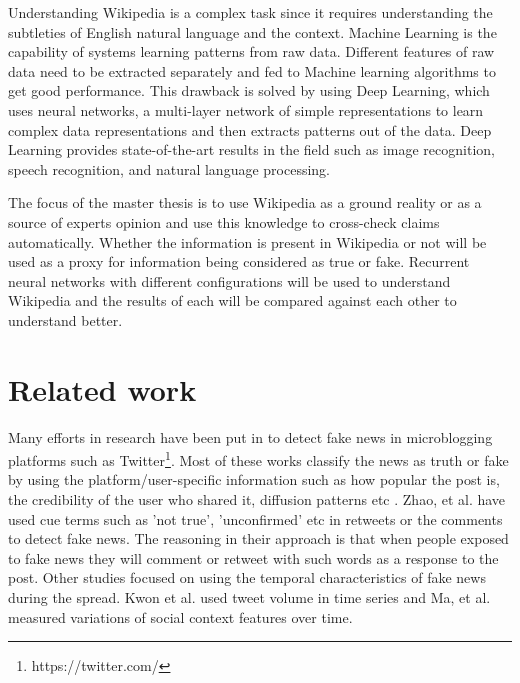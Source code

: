 \documentclass[a4paper, 11pt]{article}
\begin{document}
Understanding Wikipedia is a complex task since it requires understanding the subtleties of English natural language and the context. Machine Learning is the capability of systems learning patterns from raw data. Different features of raw data need to be extracted separately and fed to Machine learning algorithms to get good performance. This drawback is solved by using Deep Learning, which uses neural networks, a multi-layer network of simple representations to learn complex data representations and then extracts patterns out of the data\cite{Goodfellow2016}. Deep Learning provides state-of-the-art results in the field such as image recognition, speech recognition, and natural language processing.

The focus of the master thesis is to use Wikipedia as a ground reality or as a source of experts opinion and use this knowledge to cross-check claims automatically. Whether the information is present in Wikipedia or not will be used as a proxy for information being considered as true or fake. Recurrent neural networks with different configurations will be used to understand Wikipedia and the results of each will be compared against each other to understand better.

\section{Related work}


Many efforts in research have been put in to detect fake news in microblogging platforms such as Twitter\footnote{https://twitter.com/}. Most of these works classify the news as truth or fake by using the platform/user-specific information such as how popular the post is, the credibility of the user who shared it, diffusion patterns etc \cite{Liu2015} \cite{Ma2015}. Zhao, et al. \cite{Zhao2015} have used cue terms such as 'not true', 'unconfirmed' etc in retweets or the comments to detect fake news. The reasoning in their approach is that when people exposed to fake news they will comment or retweet with such words as a response to the post. Other studies focused on using the temporal characteristics of fake news during the spread. Kwon et al.\cite{Kwon2013} used tweet volume in time series and Ma, et al.\cite{Ma2015} measured variations of social context features over time. 
\end{document}
